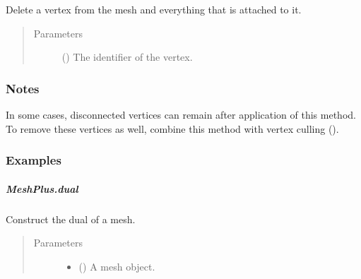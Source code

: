 \documentclass[letterpaper,10pt,english]{sphinxmanual}
\begin{document}
\begin{fulllineitems}
\begin{fulllineitems}
\label{\detokenize{api/generated/directional_clustering.mesh.MeshPlus.delete_vertex:directional_clustering.mesh.MeshPlus.delete_vertex}}
Delete a vertex from the mesh and everything that is attached to it.
\begin{quote}\begin{description}
\item[{Parameters}] \leavevmode
{} () \textendash{} The identifier of the vertex.

\end{description}\end{quote}
\subsubsection*{Notes}

In some cases, disconnected vertices can remain after application of this
method. To remove these vertices as well, combine this method with vertex
culling ({\hyperref[\detokenize{api/generated/directional_clustering.mesh.MeshPlus.cull_vertices:directional_clustering.mesh.MeshPlus.cull_vertices}]{}}).
\subsubsection*{Examples}

\begin{sphinxVerbatim}[commandchars=\\\{\}]
\end{sphinxVerbatim}

\end{fulllineitems}



\subparagraph{MeshPlus.dual}
\label{\detokenize{api/generated/directional_clustering.mesh.MeshPlus.dual:meshplus-dual}}\label{\detokenize{api/generated/directional_clustering.mesh.MeshPlus.dual::doc}}

\begin{fulllineitems}
\label{\detokenize{api/generated/directional_clustering.mesh.MeshPlus.dual:directional_clustering.mesh.MeshPlus.dual}}
Construct the dual of a mesh.
\begin{quote}\begin{description}
\item[{Parameters}] \leavevmode\begin{itemize}
\item {} 
 () \textendash{} A mesh object.


\end{itemize}
\end{description}
\end{quote}
\end{fulllineitems}
\end{fulllineitems}
\end{document}
